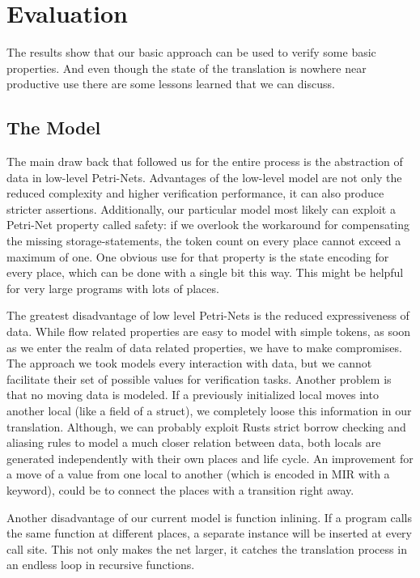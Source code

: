 \chapter{Evaluation}
\label{eval}
The results show that our basic approach can be used to verify some basic properties.
And even though the state of the translation is nowhere near productive use there are some lessons learned that we can discuss.
\section{The Model}
The main draw back that followed us for the entire process is the abstraction of data in low-level Petri-Nets.
Advantages of the low-level model are not only the reduced complexity and higher verification performance, it can also produce stricter assertions.
Additionally, our particular model most likely can exploit a Petri-Net property called safety:
if we overlook the workaround for compensating the missing storage-statements, the token count on every place cannot exceed a maximum of one.
One obvious use for that property is the state encoding for every place, which can be done with a single bit this way.
This might be helpful for very large programs with lots of places.

The greatest disadvantage of low level Petri-Nets is the reduced expressiveness of data.
While flow related properties are easy to model with simple tokens, as soon as we enter the realm of data related properties, we have to make compromises.
The approach we took models every interaction with data, but we cannot facilitate their set of possible values for verification tasks.
Another problem is that no moving data is modeled.
If a previously initialized local moves into another local (like a field of a struct), we completely loose this information in our translation.
Although, we can probably exploit Rusts strict borrow checking and aliasing rules to model a much closer relation between data,
both locals are generated independently with their own places and life cycle.
An improvement for a move of a value from one local to another (which is encoded in MIR with a keyword), could be to connect the places with a transition right away.

Another disadvantage of our current model is function inlining.
If a program calls the same function at different places, a separate instance will be inserted at every call site.
This not only makes the net larger, it catches the translation process in an endless loop in recursive functions.

